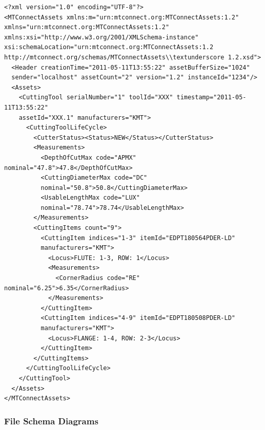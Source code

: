 \begin{lstlisting}[firstnumber=1,escapechar=|,% 
caption={Example for Shell Mill with Different Inserts on First Row}, label={lst:shell-mill-with-different-inserts-on-first-row}]
<?xml version="1.0" encoding="UTF-8"?>
<MTConnectAssets xmlns:m="urn:mtconnect.org:MTConnectAssets:1.2" 
xmlns="urn:mtconnect.org:MTConnectAssets:1.2" 
xmlns:xsi="http://www.w3.org/2001/XMLSchema-instance" 
xsi:schemaLocation="urn:mtconnect.org:MTConnectAssets:1.2 
http://mtconnect.org/schemas/MTConnectAssets\\textunderscore 1.2.xsd">
  <Header creationTime="2011-05-11T13:55:22" assetBufferSize="1024" 
  sender="localhost" assetCount="2" version="1.2" instanceId="1234"/>
  <Assets>
    <CuttingTool serialNumber="1" toolId="XXX" timestamp="2011-05-11T13:55:22" 
    assetId="XXX.1" manufacturers="KMT">
      <CuttingToolLifeCycle>
        <CutterStatus><Status>NEW</Status></CutterStatus>
        <Measurements>
          <DepthOfCutMax code="APMX" nominal="47.8">47.8</DepthOfCutMax>
          <CuttingDiameterMax code="DC" 
          nominal="50.8">50.8</CuttingDiameterMax>
          <UsableLengthMax code="LUX" 
          nominal="78.74">78.74</UsableLengthMax>
        </Measurements>
        <CuttingItems count="9">
          <CuttingItem indices="1-3" itemId="EDPT180564PDER-LD" 
          manufacturers="KMT">
            <Locus>FLUTE: 1-3, ROW: 1</Locus>
            <Measurements>
              <CornerRadius code="RE" nominal="6.25">6.35</CornerRadius>
            </Measurements>
          </CuttingItem>
          <CuttingItem indices="4-9" itemId="EDPT180508PDER-LD" 
          manufacturers="KMT">
            <Locus>FLANGE: 1-4, ROW: 2-3</Locus>
          </CuttingItem>
        </CuttingItems>
      </CuttingToolLifeCycle>
    </CuttingTool>
  </Assets>
</MTConnectAssets>
\end{lstlisting}


\subsubsection{File Schema Diagrams}
\label{sec:File Schema Diagrams}

